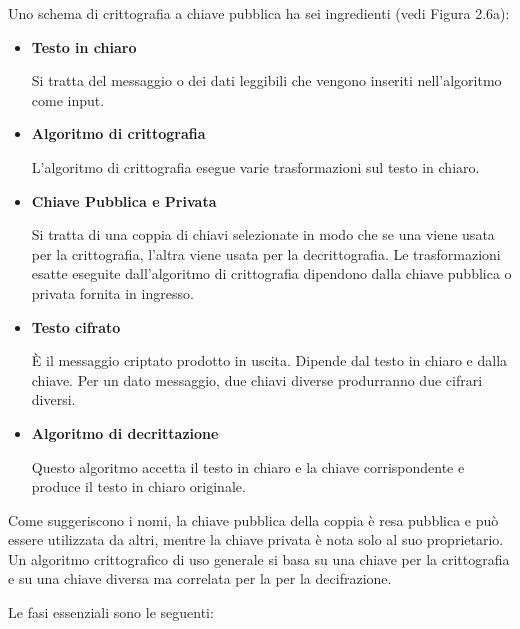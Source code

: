 \singlespacing

Uno schema di crittografia a chiave pubblica ha sei ingredienti (vedi Figura 2.6a):

\begin{itemize}
    \item \textbf{Testo in chiaro}
    
    Si tratta del messaggio o dei dati leggibili che vengono inseriti nell'algoritmo come input.
    
    \item \textbf{Algoritmo di crittografia}
    
    L'algoritmo di crittografia esegue varie trasformazioni sul testo in chiaro.
    
    \item \textbf{Chiave Pubblica e Privata}
    
    Si tratta di una coppia di chiavi selezionate in modo che se una viene usata per la crittografia, l'altra viene usata per la decrittografia. Le trasformazioni esatte eseguite dall'algoritmo di crittografia dipendono dalla chiave pubblica o privata fornita in ingresso.
    
    \item \textbf{Testo cifrato}
    
    È il messaggio criptato prodotto in uscita. Dipende dal testo in chiaro e dalla chiave. Per un dato messaggio, due chiavi diverse produrranno due cifrari diversi.
    
    \item \textbf{Algoritmo di decrittazione}
    
    Questo algoritmo accetta il testo in chiaro e la chiave corrispondente e produce il testo in chiaro originale. 
\end{itemize}

Come suggeriscono i nomi, la chiave pubblica della coppia è resa pubblica e può essere utilizzata da altri, mentre la chiave privata è nota solo al suo proprietario. Un algoritmo crittografico di uso generale si basa su una chiave per la crittografia e su una chiave diversa ma correlata per la per la decifrazione.

\singlespacing

Le fasi essenziali sono le seguenti:

